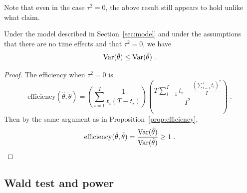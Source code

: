 \documentclass[10pt]{article}
\begin{document}
Note that even in the case $\tau^2=0$, the above result still appears to hold unlike what \textcite{Hussey:2007} claim.

\begin{corollary}
Under the model described in Section~\ref{sec:model} and under the assumptions that there are no time effects and that $\tau^2=0$, we have
\[
\mathrm{Var}(\hat{\theta}) \leq \mathrm{Var}(\tilde{\theta}) \;.
\]
\end{corollary}
\begin{proof}
The efficiency when $\tau^2=0$ is
\[
\mathrm{efficiency}(\hat{\theta},\tilde{\theta}) = \left(\sum_{i=1}^I\frac{1}{t_i(T-t_i)}\right)\left(\frac{T\sum_{i=1}^It_i-\frac{\left(\sum_{i=1}^It_i\right)^2}{I}}{I^2}\right) \;.
\]
Then by the same argument as in Proposition~\ref{prop:efficiency},
\[
\mathrm{efficiency}(\hat{\theta},\tilde{\theta}) = \frac{\mathrm{Var}(\tilde{\theta})}{\mathrm{Var}(\hat{\theta})} \geq 1 \;.
\]
\end{proof}


\subsection{Wald test and power} \label{apx:wald}
\end{document}
